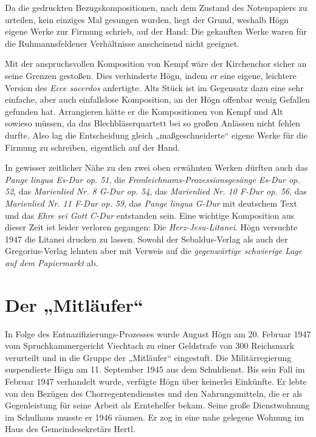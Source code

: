 \documentclass{book}
\begin{document}
Da die gedruckten Bezugskompositionen, nach dem Zustand des
Notenpapiers zu urteilen, kein einziges Mal gesungen wurden, liegt
der Grund, weshalb Högn eigene Werke zur Firmung schrieb, auf der
Hand: Die gekauften Werke waren für die Ruhmannsfeldener Verhältnisse
anscheinend nicht geeignet.

Mit der anspruchsvollen Komposition von Kempf wäre der Kirchenchor
sicher an seine Grenzen gestoßen. Dies verhinderte Högn, indem er eine
eigene, leichtere Version des \textit{Ecce sacerdos} anfertigte. Alts
Stück ist im Gegensatz dazu eine sehr einfache, aber auch
einfallslose Komposition, an der Högn offenbar wenig Gefallen gefunden
hat. Arrangieren hätte er die Kompositionen von Kempf und Alt sowieso
müssen, da das Blechbläserquartett bei so großen Anlässen nicht fehlen
durfte. Also lag die Entscheidung gleich „maßgeschneiderte“ eigene
Werke für die Firmung zu schreiben, eigentlich auf der Hand.

In gewisser zeitlicher Nähe zu den zwei oben erwähnten Werken dürften
auch das \textit{Pange lingua Es-Dur op. 51}, die
\textit{Fronleichnams-Prozessionsgesänge} \textit{Es-Dur op. 52}, das
\textit{Marienlied Nr. 8 G-Dur op. 54}, das \textit{Marienlied Nr. 10
F-Dur op. 56}, das \textit{Marienlied Nr. 11 F-Dur op. 59}, das
\textit{Pange lingua G-Dur} mit deutschem Text und das \textit{Ehre sei
Gott C-Dur} entstanden sein. Eine wichtige Komposition aus dieser Zeit
ist leider verloren gegangen: Die \textit{Herz-Jesu-Litanei}. Högn
versuchte 1947 die Litanei drucken zu lassen. Sowohl der
Sebaldus-Verlag als auch der Gregorius-Verlag lehnten aber mit Verweis
auf die \textit{gegenwärtige schwierige Lage auf dem Papiermarkt} ab.

\section{Der „Mitläufer“}

In Folge des Entnazifizierungs-Prozesses wurde August Högn am 20.
Februar 1947 vom Spruchkammergericht Viechtach zu einer Geldstrafe von
300 Reichsmark verurteilt und in die Gruppe der „Mitläufer“ eingestuft.
Die Militärregierung suspendierte Högn am 11. September 1945 aus dem
Schuldienst. Bis sein Fall im Februar 1947 verhandelt wurde, verfügte
Högn über keinerlei Einkünfte. Er lebte von den Bezügen des
Chorregentendienstes und den Nahrungsmitteln, die er als Gegenleistung
für seine Arbeit als Erntehelfer bekam. Seine große Dienstwohnung im
Schulhaus musste er 1946 räumen. Er zog in eine nahe gelegene Wohnung
im Haus des Gemeindesekretärs Hertl.
\end{document}
